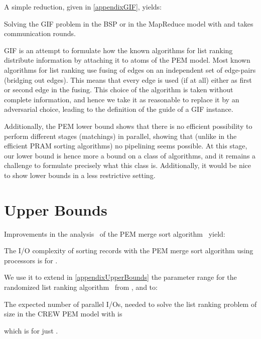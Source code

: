 \documentclass[envcountsame]{llncs}
\def\bOm#1{\printmath{\Omega \left(#1\right)}}
\begin{document}
A simple reduction, given in \autoref{appendixGIF}, yields:

\begin{theorem}
\label{theoremBSPMapReduceGIF}
Solving the GIF problem in the BSP or in the MapReduce model with  and  takes \bOm{\log \inputSize} communication rounds.
\end{theorem}



GIF is an attempt to formulate how the known algorithms for list ranking distribute information by attaching it to atoms of the PEM model.
Most known algorithms for list ranking use fusing of edges on an independent set of edge-pairs (bridging out edges). This means that every edge is used (if at all) either as first or second edge in the fusing. 
This choice of the algorithm is taken without complete information, and hence we take it as reasonable to replace it by an adversarial choice, leading to the definition of the guide of a GIF instance.


Additionally, the PEM lower bound shows that there is no efficient possibility to perform different stages (matchings) in parallel, showing that (unlike in the efficient PRAM sorting algorithms) no pipelining seems possible.
At this stage, our lower bound is hence more a bound on a class of algorithms, and it remains a challenge to formulate precisely what this class is. 
Additionally, it would be nice to show lower bounds in a less restrictive setting. 




\section{Upper Bounds}
\label{sectionUpperBounds}

Improvements in the analysis~\cite{2012ThesisGero} of the PEM merge sort algorithm~\cite{2008ArgeEtAlFundamentalPEM} yield:

\begin{lemma}
\label{theoremMergeSortPEM}
The I/O complexity of sorting  records with the PEM merge sort algorithm using  processors is  for . 
\end{lemma}

We use it to extend in \autoref{appendixUpperBounds} the parameter range for the randomized list ranking algorithm~\cite{2010ArgeEtAlGraphAlgoPEM} from , and  to:

\begin{theorem}
\label{theoremRuntimePEMListRanking}
The expected number of parallel I/Os, needed to solve the list ranking problem of size  in the CREW PEM model with  is 

which is for  just . 
\end{theorem}
\end{document}
